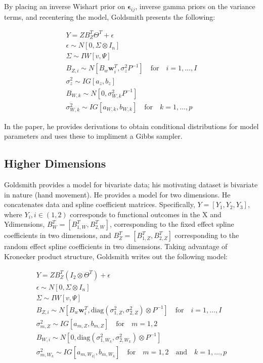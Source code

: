 \documentclass[AMA,Times1COL]{WileyNJDv5} %
\begin{document}
By placing an inverse Wishart prior on \(\boldsymbol{\epsilon}_{ij}\),  inverse gamma priors on the variance terms, and recentering the model, Goldsmith presents the following:

\begin{equation}
    \begin{split}
        Y = ZB_Z^T\Theta^T + \epsilon\\
        \epsilon\sim N[0, \Sigma\otimes I_n]\\
        \Sigma \sim IW[v, \Psi]\\
        B_{Z,i} \sim N[B_w \boldsymbol{w}_i^T, \sigma_z^2P^{-1}]\quad \text{for} \quad i = 1,\dots, I\\
        \sigma_z^2 \sim IG[a_z, b_z]\\
        B_{W, k} \sim N[0, \sigma_{W,k}^2P^{-1}]\\
        \sigma_{W,k}^2 \sim IG[a_{W,k}, b_{W,k}]\quad \text{for} \quad k = 1,\dots, p
    \end{split}
\end{equation}

In the paper, he provides derivations to obtain conditional distributions for model parameters and uses these to impliment a Gibbs sampler.  

\subsection{Higher Dimensions}
Goldsmith provides a model for bivariate data; his motivating dataset is bivariate in nature (hand movement).  He provides a model for two dimensions\cite{goldsmith_assessing_2016}.  He concatenates data and spline coefficient matrices.  Specifically, \(Y = [Y_1,Y_2, Y_3]\), where \(Y_i, i\in(1,2)\) corresponds to functional outcomes in the X and Ydimensions, \(B_W^T = [B_{1,W}^T, B_{2,W}^T]\), corresponding to the fixed effect spline coefficients in two dimensions, and \(B_Z^T = [B_{1,Z}^T, B_{2,Z}^T]\) corresponding to the random effect spline coefficients in two dimensions.  Taking advantage of Kronecker product structure,  Goldsmith writes out the following model:

\begin{equation}
    \begin{split}
        Y = ZB_Z^T\left(I_2 \otimes\Theta^T\right) + \epsilon\\
        \epsilon\sim N[0, \Sigma\otimes I_n]\\
        \Sigma \sim IW[v, \Psi]\\
        B_{Z,i} \sim N[B_w \boldsymbol{w}_i^T, \text{diag}\left(\sigma_{1,Z}^2, \sigma_{2,Z}^2\right)\otimes P^{-1}]\quad \text{for} \quad i = 1,\dots, I\\
        \sigma_{m,Z}^2 \sim IG[a_{m,Z}, b_{m,Z}]\quad \text{for} \quad m = 1,2\\
        B_{W,i} \sim N[0, \text{diag}\left(\sigma_{1,W_{k}}^2, \sigma_{2,W_{k}}^2\right)\otimes P^{-1}]\\
        \sigma_{m,W_{k}}^2 \sim IG[a_{m,W_{k]}}, b_{m,W_{k}}]\quad \text{for} \quad m = 1,2 \quad\text{and} \quad k = 1,\dots, p
    \end{split}
\end{equation}
\end{document}
